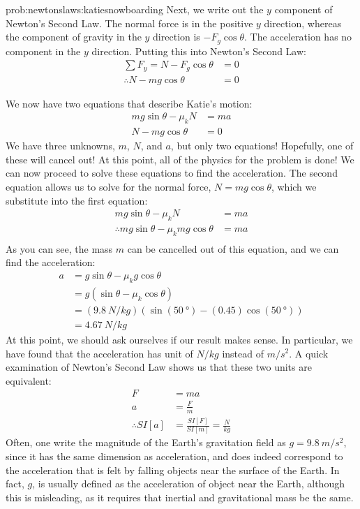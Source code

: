 \begin{solution}{prob:newtonslaws:katiesnowboarding}
Next, we write out the $y$ component of Newton's Second Law. The normal force is in the positive $y$ direction, whereas the component of gravity in the $y$ direction is $-F_g\cos\theta$. The acceleration has no component in the $y$ direction. Putting this into Newton's Second Law:
\begin{align*}
\sum F_y = N-F_g\cos\theta &=0\\
\therefore N-mg\cos\theta &=0
\end{align*}

We now have two equations that describe Katie's motion:
\begin{align*}
mg\sin\theta -\mu_k N &= ma\\
N-mg\cos\theta &=0
\end{align*}
We have three unknowns, $m$, $N$, and $a$, but only two equations! Hopefully, one of these will cancel out! At this point, all of the physics for the problem is done! We can now proceed to solve these equations to find the acceleration. The second equation allows us to solve for the normal force, $N=mg\cos\theta$, which we substitute into the first equation:
\begin{align*}
mg\sin\theta -\mu_k N &= ma\\
\therefore mg\sin\theta -\mu_k mg\cos\theta &= ma\\
\end{align*}
As you can see, the mass $m$ can be cancelled out of this equation, and we can find the acceleration:
\begin{align*}
a&=g\sin\theta -\mu_k g\cos\theta\\
&=g(\sin\theta-\mu_k\cos\theta)\\
&=(\SI{9.8}{N/kg})\left(\sin(\SI{50}{\degree})-(0.45)\cos(\SI{50}{\degree})\right)\\
&=\SI{4.67}{N/kg} 
\end{align*}
At this point, we should ask ourselves if our result makes sense. In particular, we have found that the acceleration has unit of $\si{N/kg}$ instead of $\si{m/s^2}$. A quick examination of Newton's Second Law shows us that these two units are equivalent:
\begin{align*}
F &= ma\\
a &= \frac{F}{m}\\
\therefore SI[a] &= \frac{SI[F]}{SI[m]}=\frac{\si{N}}{\si{kg}}
\end{align*}
Often, one write the magnitude of the Earth's gravitation field as $g=\SI{9.8}{m/s^2}$, since it has the same dimension as acceleration, and does indeed correspond to the acceleration that is felt by falling objects near the surface of the Earth. In fact, $g$, is usually defined as the acceleration of object near the Earth, although this is misleading, as it requires that inertial and gravitational mass be the same. 



\end{solution}
